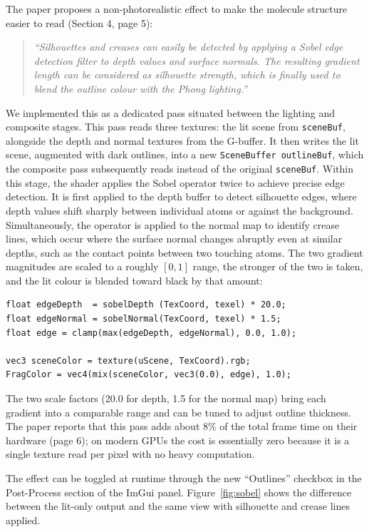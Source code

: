 \documentclass[12pt, a4paper]{article}
\begin{document}
The paper proposes a non-photorealistic effect to make the molecule structure easier to read (Section 4, page 5):
\begin{quote}
\textit{``Silhouettes and creases can easily be detected by applying a Sobel edge detection filter to depth values and surface normals. The resulting gradient length can be considered as silhouette strength, which is finally used to blend the outline colour with the Phong lighting.''}
\end{quote}

We implemented this as a dedicated pass situated between the lighting and composite stages. This pass reads three textures: the lit scene from \texttt{sceneBuf}, alongside the depth and normal textures from the G-buffer. It then writes the lit scene, augmented with dark outlines, into a new \texttt{SceneBuffer outlineBuf}, which the composite pass subsequently reads instead of the original \texttt{sceneBuf}. Within this stage, the shader applies the Sobel operator twice to achieve precise edge detection. It is first applied to the depth buffer to detect silhouette edges, where depth values shift sharply between individual atoms or against the background. Simultaneously, the operator is applied to the normal map to identify crease lines, which occur where the surface normal changes abruptly even at similar depths, such as the contact points between two touching atoms.
The two gradient magnitudes are scaled to a roughly $[0, 1]$ range, the stronger of the two is taken, and the lit colour is blended toward black by that amount:
\begin{lstlisting}[style=glslstyle, caption={Sobel edge detection on G-buffer (silhouette.frag)}]
float edgeDepth  = sobelDepth (TexCoord, texel) * 20.0;
float edgeNormal = sobelNormal(TexCoord, texel) * 1.5;
float edge = clamp(max(edgeDepth, edgeNormal), 0.0, 1.0);

vec3 sceneColor = texture(uScene, TexCoord).rgb;
FragColor = vec4(mix(sceneColor, vec3(0.0), edge), 1.0);
\end{lstlisting}

The two scale factors (20.0 for depth, 1.5 for the normal map) bring each gradient into a comparable range and can be tuned to adjust outline thickness. The paper reports that this pass adds about 8\% of the total frame time on their hardware (page 6); on modern GPUs the cost is essentially zero because it is a single texture read per pixel with no heavy computation.

The effect can be toggled at runtime through the new ``Outlines'' checkbox in the Post-Process section of the ImGui panel. Figure~\ref{fig:sobel} shows the difference between the lit-only output and the same view with silhouette and crease lines applied.
\end{document}
